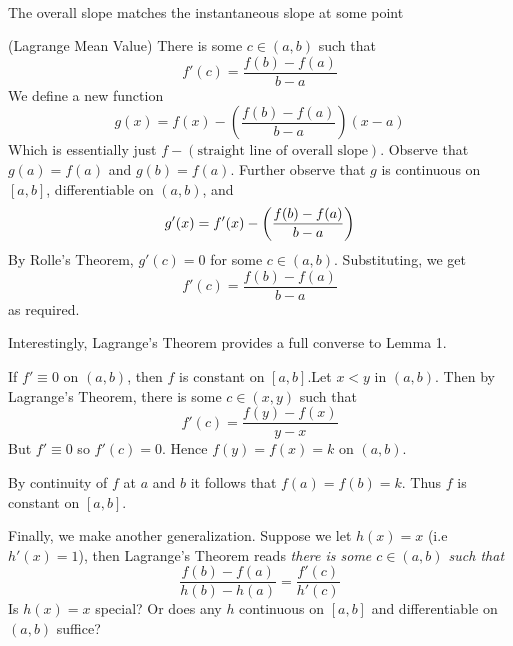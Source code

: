 \begin{center}
\\
The overall slope matches the instantaneous slope at some point
\end{center}
\begin{SWP}{\thm}{(Lagrange Mean Value) There is some $c \in (a, b)$ such that
$$
f'(c) = \frac{f(b) - f(a)}{b - a}
$$}We define a new function
$$
g(x) = f(x) - \left(\frac{f(b) - f(a)}{b - a}\right)(x - a)
$$
Which is essentially just $f - (\text{straight line of overall slope})$. Observe that $g(a) = f(a)$ and $g(b) = f(a)$. Further observe that $g$ is continuous on $[a, b]$, differentiable on $(a, b)$, and
$$
g'(x) = f'(x) - \left ( {\frac{f(b) - f(a)}{b - a}} \right )
$$
By Rolle's Theorem, $g'(c) = 0$ for some $c \in (a, b)$. Substituting, we get
$$
f'(c) = \frac{f(b) - f(a)}{b - a}
$$
as required.
\end{SWP}

Interestingly, Lagrange's Theorem provides a full converse to Lemma 1.
\begin{SWP}{\thm}{If $f' \equiv 0$ on $(a, b)$, then $f$ is constant on $[a, b]$.}Let $x < y$ in $(a, b)$. Then by Lagrange's Theorem, there is some $c \in (x, y)$ such that
$$
f'(c) = \frac{f(y) - f(x)}{y - x}
$$
But $f' \equiv 0$ so $f'(c) = 0$. Hence $f(y) = f(x) = k$ on $(a, b)$.

By continuity of $f$ at $a$ and $b$ it follows that $f(a) = f(b) = k$. Thus $f$ is constant on $[a, b]$.
\end{SWP}

Finally, we make another generalization. Suppose we let $h(x) = x$ (i.e $h'(x) = 1$), then Lagrange's Theorem reads \emph{there is some $c \in (a, b)$ such that $$\frac{f(b) - f(a)}{h(b) - h(a)} = \frac{f'(c)}{h'(c)}$$}Is $h(x) = x$ special? Or does any $h$ continuous on $[a, b]$ and differentiable on $(a, b)$ suffice?

